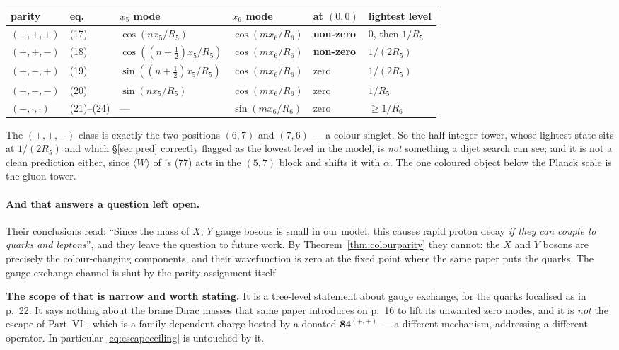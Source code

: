 \documentclass[11pt,a4paper]{article}
\newcommand{\rep}[1]{\mathbf{#1}}
\begin{document}
\begin{center}\small
{}
\begin{tabular}{llllll}
\toprule
\rowcolor{hdrblue!10} parity & eq. & $x_5$ mode & $x_6$ mode & at $(0,0)$ & lightest level\\
\midrule
$(+,+,+)$ & (17) & $\cos(nx_5/R_5)$ & $\cos(mx_6/R_6)$ & \textbf{non-zero} & $0$, then $1/R_5$\\
$(+,+,-)$ & (18) & $\cos((n{+}\tfrac12)x_5/R_5)$ & $\cos(mx_6/R_6)$ & \textbf{non-zero} & $1/(2R_5)$\\
$(+,-,+)$ & (19) & $\sin((n{+}\tfrac12)x_5/R_5)$ & $\cos(mx_6/R_6)$ & zero & $1/(2R_5)$\\
$(+,-,-)$ & (20) & $\sin(nx_5/R_5)$ & $\cos(mx_6/R_6)$ & zero & $1/R_5$\\
$(-,\cdot,\cdot)$ & (21)--(24) & --- & $\sin(mx_6/R_6)$ & zero & $\ge 1/R_6$\\
\bottomrule
\end{tabular}
\end{center}

\noindent The $(+,+,-)$ class is exactly the two positions $(6,7)$ and $(7,6)$ --- a colour
singlet. So the half-integer tower, whose lightest state sits at $1/(2R_5)$ and which
\S\ref{sec:pred} correctly flagged as the lowest level in the model, is \emph{not} something a
dijet search can see; and it is not a clean prediction either, since $\langle W\rangle$ of
\cite{KM25}'s (77) acts in the $(5,7)$ block and shifts it with $\alpha$. The one coloured object
below the Planck scale is the gluon tower.

\paragraph{And that answers a question \cite{KM25} left open.} Their conclusions read: ``Since the
mass of $X$, $Y$ gauge bosons is small in our model, this causes rapid proton decay \emph{if they
can couple to quarks and leptons}'', and they leave the question to future work. By
Theorem~\ref{thm:colourparity} they cannot: the $X$ and $Y$ bosons are precisely the
colour-changing components, and their wavefunction is zero at the fixed point where the same paper
puts the quarks. The gauge-exchange channel is shut by the parity assignment itself.

\noindent\textbf{The scope of that is narrow and worth stating.} It is a tree-level statement about
gauge exchange, for the quarks localised as in \cite{KM25} p.~22. It says nothing about the brane
Dirac masses that same paper introduces on p.~16 to lift its unwanted zero modes, and it is
\emph{not} the escape of Part~VI \cite{PartVI}, which is a family-dependent charge hosted by a
donated $\rep{84}^{(+,+)}$ --- a different mechanism, addressing a different operator. In
particular \eqref{eq:escapeceiling} is untouched by it.
\end{document}
